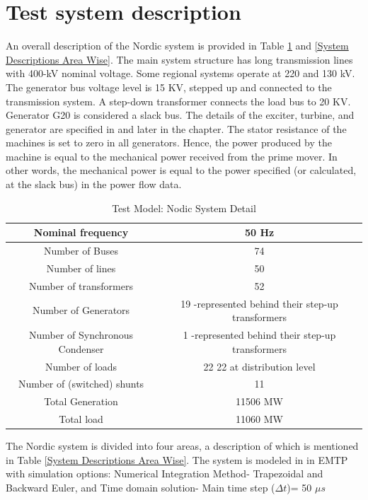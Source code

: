 \documentclass{report}
\begin{document}
\section{Test system description}
An overall description of the Nordic system is provided in Table \ref{table:1} and \ref{System Descriptions Area Wise}. The main system structure has long transmission lines with 400-kV nominal voltage. Some regional systems operate at 220 and 130 kV. The generator bus voltage level is 15 KV, stepped up and connected to the transmission system. A step-down transformer connects the load bus to 20 KV. Generator G20 is considered a slack bus. The details of the exciter, turbine, and generator are specified in \cite{van2015test} and later in the chapter. The stator resistance of the machines is set to zero in all generators. Hence, the power produced by the machine is equal to the mechanical power received from the prime mover. In other words, the mechanical power is equal to the power specified (or calculated, at the slack bus) in the power flow data.
\begin{table}[h!]
\centering
\caption{Test Model: Nodic System Detail}
\begin{tabular}{|c|c|}
 \hline
 \hline
 Nominal frequency & 50 Hz \\
 \hline
 Number of Buses & 74 \\
 \hline
 Number of lines & 50 \\
 \hline
 Number of transformers & 52 \\ 
  \hline
 Number of Generators & 19 -represented behind their step-up transformers\\
   \hline
 Number of Synchronous Condenser & 1 -represented behind their step-up transformers\\
 \hline
  Number of loads & 22 22 at distribution level \\ 
  \hline
   Number of (switched) shunts & 11 \\ 
     \hline
   Total Generation & 11506 MW \\   \hline
   Total load & 11060 MW \\ 
  \hline
 \hline
\end{tabular}
\label{table:1}
\end{table}
The Nordic system is divided into four areas, a description of which is mentioned in Table \ref{System Descriptions Area Wise}. The system is modeled in in EMTP with simulation options: Numerical Integration Method- Trapezoidal and Backward Euler, and Time domain solution- Main time step ($\Delta t$)= 50 $\mu s$
\end{document}
